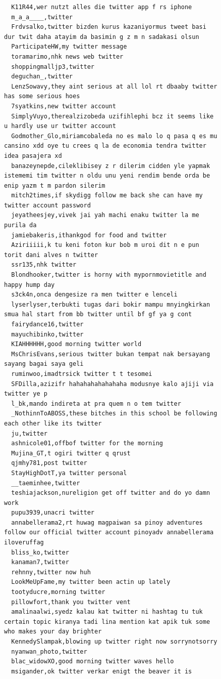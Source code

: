 \begin{figure}[htpb]
\begin{verbatim}
  K11R44,wer nutzt alles die twitter app f rs iphone
  m_a_a____,twitter
  Frdvsalko,twitter bizden kurus kazaniyormus tweet basi dur twit daha atayim da basimin g z m n sadakasi olsun
  ParticipateHW,my twitter message
  toramarimo,nhk news web twitter
  shoppingmalljp3,twitter
  deguchan_,twitter
  LenzSowavy,they aint serious at all lol rt dbaaby twitter has some serious hoes
  7syatkins,new twitter account
  SimplyVuyo,therealzizobeda uzifihlephi bcz it seems like u hardly use ur twitter account
  Godmother_Glo,miriamcobaleda no es malo lo q pasa q es mu cansino xdd oye tu crees q la de economia tendra twitter idea pasajera xd
  banazeynepde,cileklibisey z r dilerim cidden yle yapmak istememi tim twitter n oldu unu yeni rendim bende orda be enip yazm t m pardon silerim
  mitch2times,if skydigg follow me back she can have my twitter account password
  jeyatheesjey,vivek jai yah machi enaku twitter la me purila da
  jamiebakeris,ithankgod for food and twitter
  Aziriiiii,k tu keni foton kur bob m uroi dit n e pun torit dani alves n twitter
  ssr135,nhk twitter
  Blondhooker,twitter is horny with mypornmovietitle and happy hump day
  s3ck4n,onca dengesize ra men twitter e lenceli
  lyserlyser,terbukti tugas dari bokir mampu mnyingkirkan smua hal start from bb twitter until bf gf ya g cont
  fairydance16,twitter
  mayuchibinko,twitter
  KIAHHHHHH,good morning twitter world
  MsChrisEvans,serious twitter bukan tempat nak bersayang sayang bagai saya geli
  ruminwoo,imadtrsick twitter t t tesomei
  SFDilla,azizifr hahahahahahahaha modusnye kalo ajiji via twitter ye p
  l_bk,mando indireta at pra quem n o tem twitter
  _NothinnToABOSS,these bitches in this school be following each other like its twitter
  ju,twitter
  ashnicole01,offbof twitter for the morning
  Mujina_GT,t ogiri twitter q qrust
  qjmhy781,post twitter
  StayHighDotT,ya twitter personal
  __taeminhee,twitter
  teshiajackson,nureligion get off twitter and do yo damn work
  pupu3939,unacri twitter
  annabellerama2,rt huwag magpaiwan sa pinoy adventures follow our official twitter account pinoyadv annabellerama iloveruffag
  bliss_ko,twitter
  kanaman7,twitter
  rehnny,twitter now huh
  LookMeUpFame,my twitter been actin up lately
  tootyducre,morning twitter
  pillowfort,thank you twitter vent
  amalinaalwi,syedz kalau kat twitter ni hashtag tu tuk certain topic kiranya tadi lina mention kat apik tuk some who makes your day brighter
  KennedySlampak,blowing up twitter right now sorrynotsorry
  nyanwan_photo,twitter
  blac_widowXO,good morning twitter waves hello
  msigander,ok twitter verkar enigt the beaver it is

\end{verbatim}
\end{figure}
